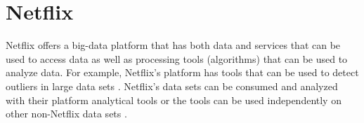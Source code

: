\section{Netflix}

Netflix offers a big-data platform that has both data and services that can be
used to access data as well as processing tools (algorithms) that can be used
to analyze data.  For example, Netflix's platform has tools that can be used to
detect outliers in large data sets \cite{Wong2015}.  Netflix’s data sets can be
consumed and analyzed with their platform analytical tools or the tools can be
used independently on other non-Netflix data sets \cite{Netflix2018}.
